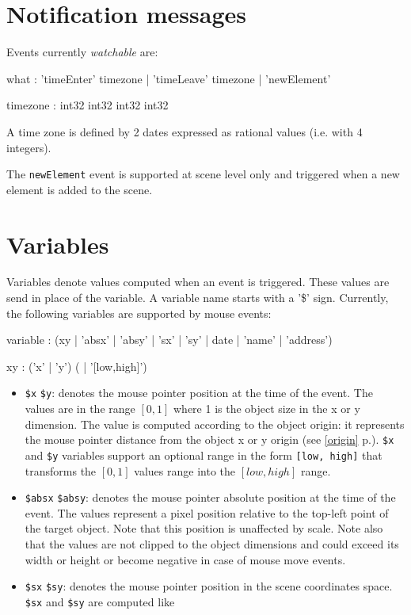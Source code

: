 \documentclass[a4paper,twoside]{report}
\newcommand{\sublevel}[1]	{\section{#1}}
\newcommand{\fullref}[1]	{\ref{#1} p.\pageref{#1}}
\newcommand{\OSC}[1]		{\texttt{#1}}
\begin{document}
\sublevel{Notification messages}
\label{notifymsg}

Events currently \emph{watchable} are:
\begin{rail}
what : 'timeEnter' timezone | 'timeLeave' timezone | 'newElement'
\end{rail}

\begin{rail}
timezone : int32 int32 int32 int32
\end{rail}
A time zone is defined by 2 dates expressed as rational values (i.e. with 4 integers).

The \OSC{newElement} event is supported at scene level only and triggered when a new element is added to the scene.


\sublevel{Variables}
\label{interactvar}

Variables denote values computed when an event is triggered. These values are send in place of the variable. A variable name starts with a '\$' sign. Currently, the following variables are supported by mouse events:
\begin{rail} 
variable : (xy | 'absx' | 'absy' | 'sx' | 'sy' | date | 'name' | 'address') 
\end{rail}

\begin{rail} 
xy : ('x' | 'y') ( | '[low,high]') 
\end{rail}

\begin{itemize}
\item \OSC{\$x} \OSC{\$y}: denotes the mouse pointer position at the time of the event. The values are in the range $[0,1]$ where 1 is the object size in the x or y dimension. The value is computed according to the object origin: it represents the mouse pointer distance from the object x or y origin (see \fullref{origin}). \OSC{\$x} and \OSC{\$y} variables support an optional range in the form \OSC{[low, high]} that transforms the $[0,1]$  values range into the $[low, high]$ range.

\item \OSC{\$absx} \OSC{\$absy}: denotes the mouse pointer absolute position at the time of the event. The values represent a pixel position relative to the top-left point of the target object. Note that this position is unaffected by scale. 
Note also that the values are not clipped to the object dimensions and could exceed its width or height or become negative in case of mouse move events.

\item \OSC{\$sx} \OSC{\$sy}: denotes the mouse pointer position in the scene coordinates space. \OSC{\$sx} and \OSC{\$sy} are computed like
\end{itemize}
\end{document}

